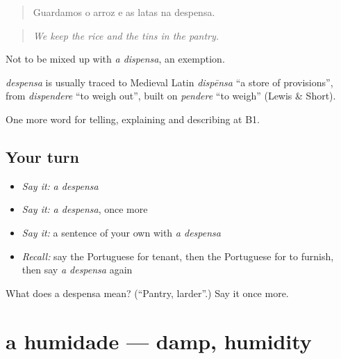 \begin{quote}
Guardamos o arroz e as latas na despensa.
\end{quote}

\begin{quote}
\emph{We keep the rice and the tins in the pantry.}
\end{quote}

Not to be mixed up with \emph{a dispensa}, an exemption.

\begin{cousinweb}
\emph{despensa} is usually traced to Medieval Latin \emph{dispēnsa} \textquotedblleft{}a store of provisions\textquotedblright{}, from \emph{dispendere} \textquotedblleft{}to weigh out\textquotedblright{}, built on \emph{pendere} \textquotedblleft{}to weigh\textquotedblright{} (Lewis \& Short).
\end{cousinweb}

\begin{grammarlens}[title={What you've built}]
One more word for telling, explaining and describing at B1.
\end{grammarlens}

\subsection*{Your turn}
\begin{itemize}
\raggedright
  \item \emph{Say it:} \emph{a despensa}
  \item \emph{Say it:} \emph{a despensa}, once more
  \item \emph{Say it:} a sentence of your own with \emph{a despensa}
  \item \emph{Recall:} say the Portuguese for tenant, then the Portuguese for to furnish, then say \emph{a despensa} again
\end{itemize}

\begin{tcolorbox}[breakable,colback=teal!4,colframe=teal!35!black,title={Before you move on}]
What does a despensa mean? (\textquotedblleft{}Pantry, larder\textquotedblright{}.) Say it once more.
\end{tcolorbox}
\section[a humidade]{a humidade — damp, humidity}

\label{lesson:PT-C530-humidade}




